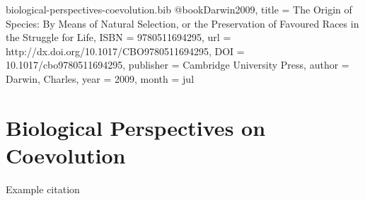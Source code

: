\begin{bibunit}

\begin{filecontents*}[overwrite]{biological-perspectives-coevolution.bib}
@book{Darwin2009,
  title = {The Origin of Species: By Means of Natural Selection,  or the Preservation of Favoured Races in the Struggle for Life},
  ISBN = {9780511694295},
  url = {http://dx.doi.org/10.1017/CBO9780511694295},
  DOI = {10.1017/cbo9780511694295},
  publisher = {Cambridge University Press},
  author = {Darwin,  Charles},
  year = {2009},
  month = jul 
}
\end{filecontents*} 

\section{Biological Perspectives on Coevolution}
\label{sec:coevolution}

Example citation \citep{Darwin2009}

    
\end{bibunit}
